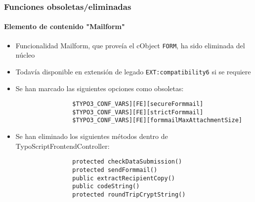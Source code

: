 
\begin{frame}[fragile]
	\frametitle{Funciones obsoletas/eliminadas}
	\framesubtitle{Elemento de contenido "Mailform"}

	\begin{itemize}

		\item Funcionalidad Mailform, que proveía el cObject \texttt{FORM}, ha sido
			eliminada del núcleo
		
		\item Todavía disponible en extensión de legado \texttt{EXT:compatibility6} si se requiere

		\item Se han marcado las siguientes opciones como obsoletas:

			\begin{lstlisting}
				$TYPO3_CONF_VARS][FE][secureFormmail]
				$TYPO3_CONF_VARS][FE][strictFormmail]
				$TYPO3_CONF_VARS][FE][formmailMaxAttachmentSize]
			\end{lstlisting}

		\item Se han eliminado los siguientes métodos dentro de TypoScriptFrontendController:

			\begin{lstlisting}
				protected checkDataSubmission()
				protected sendFormmail()
				public extractRecipientCopy()
				public codeString()
				protected roundTripCryptString()
			\end{lstlisting}

	\end{itemize}

\end{frame}


